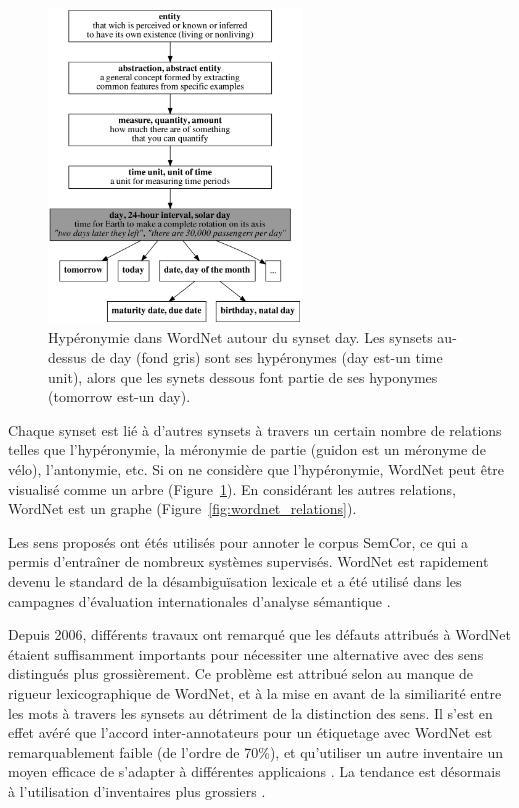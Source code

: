 \begin{figure}[ht]
    \centering
    \includegraphics[width=0.6\textwidth]{fig/wordnet_hypernymy.png}
    \caption{\label{fig:wordnet_hypernymy}Hypéronymie dans WordNet autour du
synset day. Les synsets au-dessus de day (fond gris) sont ses hypéronymes (day
est-un time unit), alors que les synets dessous font partie de ses hyponymes
(tomorrow est-un day).}
\end{figure}

Chaque synset est lié à d'autres synsets à travers un certain nombre de
relations telles que l'hypéronymie, la méronymie de partie (guidon est un
méronyme de vélo), l'antonymie, etc. Si on ne considère que l'hypéronymie,
WordNet peut être visualisé comme un arbre
(Figure~\ref{fig:wordnet_hypernymy}). En considérant les autres relations,
WordNet est un graphe (Figure~\ref{fig:wordnet_relations}).


Les sens proposés ont étés utilisés pour annoter le corpus SemCor, ce qui a
permis d'entraîner de nombreux systèmes supervisés. WordNet est rapidement
devenu le standard de la désambiguïsation lexicale et a été utilisé dans les
campagnes d'évaluation internationales d'analyse sémantique
\citep{navigli2009word}.


Depuis 2006, différents travaux \citep{navigli2007semeval,hovy2006ontonotes}
ont remarqué que les défauts attribués à WordNet
\citep{snow2007learning,ide2007making} étaient suffisamment importants pour
nécessiter une alternative avec des sens distingués plus grossièrement. Ce
problème est attribué selon \cite{edmonds2002introduction} au manque de rigueur
lexicographique de WordNet, et à la mise en avant de la similiarité entre les
mots à travers les synsets au détriment de la distinction des sens. Il s'est en
effet avéré que l'accord inter-annotateurs pour un étiquetage avec WordNet est
remarquablement faible (de l'ordre de 70\%), et qu'utiliser un autre inventaire
un moyen efficace de s'adapter à différentes applicaions
\citep{palmer2004different}. La tendance est désormais à l'utilisation
d'inventaires plus grossiers \citep{navigli2007semeval,navigli2012quick}.


